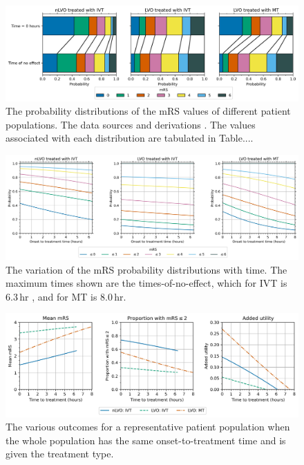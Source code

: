 \begin{figure}
    \centering
    \includegraphics[width=\columnwidth]{images/dist_bars.jpg}
    \caption{
        The probability distributions of the mRS values of different patient populations. 
        The data sources and derivations .
        The values associated with each distribution are tabulated in Table.... }
    \label{app_fig:dist_bars}
\end{figure}

\begin{figure}
    \centering
    \includegraphics[width=\columnwidth]{images/probs_with_time.jpg}
    \caption{
        The variation of the mRS probability distributions with time.
        The maximum times shown are the times-of-no-effect, which for IVT is 6.3\,hr \cite{emberson_effect_2014},
        and for MT is 8.0\,hr\cite{goyal_endovascular_2016}.
        }
    \label{fig:app_probs_with_time}
\end{figure}

\begin{figure}
    \centering
    \includegraphics[width=\columnwidth]{images/time_to_treatment.jpg}
    \caption{
        The various outcomes for a representative patient population when the whole population has the same onset-to-treatment time and is given the treatment type. 
        }
    \label{app_fig:changes_with_time}
\end{figure}


